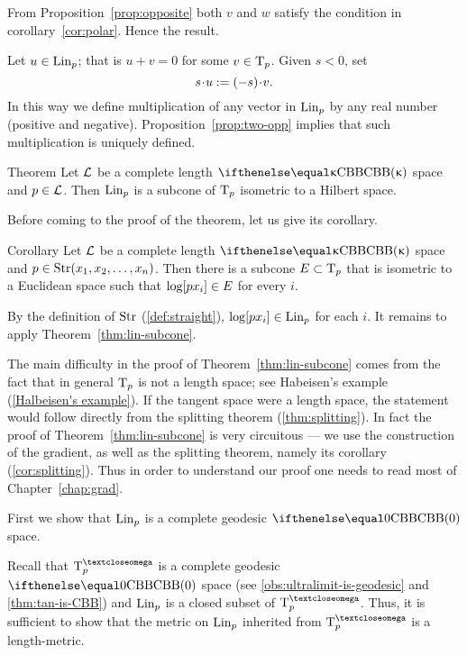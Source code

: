 From Proposition~\ref{prop:opposite} both $v$ and $w$ satisfy the condition in corollary~\ref{cor:polar}. 
Hence the result.\qeds

Let $u\in \Lin_p$; that is $u+v=0$ for some $v\in\T_p$.
Given $s<0$, set 
\[s\cdot u\df (-s)\cdot v.\]
In this way we define multiplication of any vector in $\mathop{\rm Lin}\nolimits_p$ by any real number (positive and negative).
Proposition~\ref{prop:two-opp} implies that such multiplication is uniquely defined.


\begin{thm}{Theorem}\label{thm:lin-subcone}
Let $\mathcal{L}$  be a complete length $\Alex{\kappa}$ space and $p\in \spc{L}$. 
Then $\mathop{\rm Lin}\nolimits_p$ is a subcone of $\text{\rm T}_p$ isometric to a Hilbert space.
\end{thm}

Before coming to the proof of the theorem, 
let us give its corollary.

\begin{thm}{Corollary}\label{cor:euclid-subcone}
Let $\mathcal{L}$  be a complete length $\Alex{\kappa}$ space
and $p\in \Str(x_1,x_2,\dots,x_n)$.
Then there is a subcone $E\subset \T_p$ that is isometric to a Euclidean space such that $\ddir p{x_i}\in E$ for every $i$.
\end{thm}

By the definition of $\mathop{\rm Str}\nolimits$ (\ref{def:straight}), $\ddir{p}{x_i}\in \Lin_p$ for each $i$.
It remains to apply Theorem~\ref{thm:lin-subcone}.
\qeds

The main difficulty in the proof of Theorem~\ref{thm:lin-subcone} comes from the fact that in general $\text{\rm T}_p$ is not a length space;
see Habeisen's example (\ref{Halbeisen's example}).
If the tangent space were a length space, the statement would follow directly from the splitting theorem (\ref{thm:splitting}).
In fact the proof of Theorem~\ref{thm:lin-subcone}
   is very circuitous --- we use the construction of the gradient, as well as the splitting theorem, namely its corollary (\ref{cor:splitting}).
Thus in order to understand our proof one needs to read most of Chapter~\ref{chap:grad}.

First we show that $\mathop{\rm Lin}\nolimits_p$ is a complete geodesic $\Alex0$ space.

Recall that $\T^\o_p$ is a complete geodesic $\Alex0$ space (see \ref{obs:ultralimit-is-geodesic} and \ref{thm:tan-is-CBB}) and $\mathop{\rm Lin}\nolimits_p$ is a closed subset of $\T^\o_p$.
Thus, it is sufficient to show that the metric on $\mathop{\rm Lin}\nolimits_p$ inherited from $\T^\o_p$ is a length-metric.

